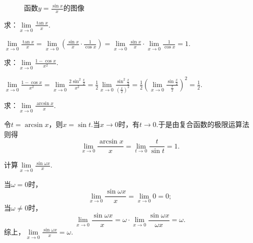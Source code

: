 \begin{figure}[ht]
	\centering
	\caption{函数\(y=\frac{\sin x}{x}\)的图像}
	\label{figure:极限.函数[y=sin(x)/x]的图像}
\end{figure}

\begin{example}
\def\l{\lim\limits_{x\to0}}
求：\(\l \frac{\tan x}{x}\).
\begin{solution}
\(
\l \frac{\tan x}{x}
= \l \left(\frac{\sin x}{x} \cdot \frac{1}{\cos x}\right)
= \l \frac{\sin x}{x} \cdot \lim\limits_{x\to0}\frac{1}{\cos x}
= 1.
\)
\end{solution}
\end{example}

\begin{example}
\def\l{\lim\limits_{x\to0}}
求：\(\l \frac{1 - \cos x}{x^2}\).
\begin{solution}
\(
\l \frac{1 - \cos x}{x^2}
= \l \frac{2 \sin^2\frac{x}{2}}{x^2}
= \frac{1}{2} \l \frac{\sin^2\frac{x}{2}}{\left(\frac{x}{2}\right)^2}
= \frac{1}{2} \left(\l \frac{\sin \frac{x}{2}}{\frac{x}{2}}\right)^2
= \frac{1}{2}.
\)
\end{solution}
\end{example}

\begin{example}
求：\(\lim\limits_{x\to0}\frac{\arcsin x}{x}\).
\begin{solution}
令\(t = \arcsin x\)，则\(x = \sin t\).当\(x\to0\)时，有\(t\to0\).于是由复合函数的极限运算法则得\[
\lim\limits_{x\to0}\frac{\arcsin x}{x}
= \lim\limits_{t\to0}\frac{t}{\sin t}
= 1.
\]
\end{solution}
\end{example}

\begin{example}
\def\l{\lim\limits_{x\to0}}
计算\(\l \frac{\sin \omega x}{x}\).
\begin{solution}
当\(\omega=0\)时，\[
\l \frac{\sin \omega x}{x} = \l 0 = 0;
\]当\(\omega\neq0\)时，\[
\l \frac{\sin \omega x}{x}
= \omega \cdot \l \frac{\sin \omega x}{\omega x}
= \omega.
\]综上，\(\l \frac{\sin \omega x}{x} = \omega\).
\end{solution}
\end{example}


